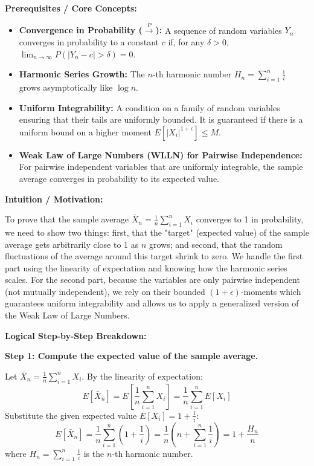 \begin{solution}
\textbf{Prerequisites / Core Concepts:}
\begin{itemize}
    \item \textbf{Convergence in Probability ($\xrightarrow{P}$):} A sequence of random variables $Y_n$ converges in probability to a constant $c$ if, for any $\delta > 0$, $\lim_{n\to\infty} P(|Y_n - c| > \delta) = 0$.
    \item \textbf{Harmonic Series Growth:} The $n$-th harmonic number $H_n = \sum_{i=1}^n \frac{1}{i}$ grows asymptotically like $\log n$.
    \item \textbf{Uniform Integrability:} A condition on a family of random variables ensuring that their tails are uniformly bounded. It is guaranteed if there is a uniform bound on a higher moment $E[|X_i|^{1+\epsilon}] \le M$.
    \item \textbf{Weak Law of Large Numbers (WLLN) for Pairwise Independence:} For pairwise independent variables that are uniformly integrable, the sample average converges in probability to its expected value.
\end{itemize}

\textbf{Intuition / Motivation:}

To prove that the sample average $\bar{X}_n = \frac{1}{n} \sum_{i=1}^n X_i$ converges to 1 in probability, we need to show two things: first, that the "target" (expected value) of the sample average gets arbitrarily close to 1 as $n$ grows; and second, that the random fluctuations of the average around this target shrink to zero. We handle the first part using the linearity of expectation and knowing how the harmonic series scales. For the second part, because the variables are only pairwise independent (not mutually independent), we rely on their bounded $(1+\epsilon)$-moments which guarantees uniform integrability and allows us to apply a generalized version of the Weak Law of Large Numbers.

\textbf{Logical Step-by-Step Breakdown:}

\textbf{Step 1: Compute the expected value of the sample average.}

Let $\bar{X}_n = \frac{1}{n} \sum_{i=1}^n X_i$. By the linearity of expectation:
\[ E[\bar{X}_n] = E\left[ \frac{1}{n} \sum_{i=1}^n X_i \right] = \frac{1}{n} \sum_{i=1}^n E[X_i] \]
Substitute the given expected value $E[X_i] = 1 + \frac{1}{i}$:
\[ E[\bar{X}_n] = \frac{1}{n} \sum_{i=1}^n \left(1 + \frac{1}{i}\right) = \frac{1}{n} \left( n + \sum_{i=1}^n \frac{1}{i} \right) = 1 + \frac{H_n}{n} \]
where $H_n = \sum_{i=1}^n \frac{1}{i}$ is the $n$-th harmonic number.


\end{solution}
